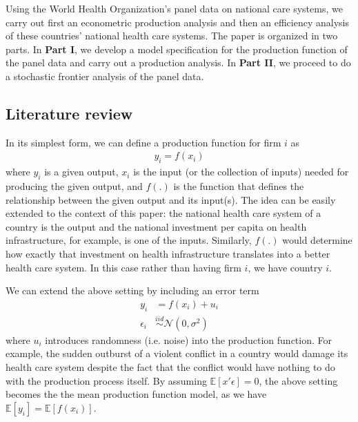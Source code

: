 \documentclass[12pt,a4paper]{article}\usepackage[]{graphicx}\usepackage[]{color}
\begin{document}
Using the World Health Organization's panel data on national care systems, we carry out first an econometric production analysis and then an efficiency analysis of these countries' national health care systems. The paper is organized in two parts. In \textbf{Part I}, we develop a model specification for the production function of the panel data and carry out a production analysis. In \textbf{Part II}, we proceed to do a stochastic frontier analysis of the panel data.

\subsection{Literature review}

In its simplest form, we can define a production function for firm $i$ as
$$
\begin{aligned}
y_i = f(x_i)
\end{aligned}
$$
where $y_i$ is a given output, $x_i$ is the input (or the collection of inputs) needed for producing the given output, and $f(.)$ is the function that defines the relationship between the given output and its input(s). The idea can be easily extended to the context of this paper: the national health care system of a country is the output and the national investment per capita on health infrastructure, for example, is one of the inputs. Similarly, $f(.)$ would determine how exactly that investment on health infrastructure translates into a better health care system. In this case rather than having firm $i$, we have country $i$.

We can extend the above setting by including an error term
$$
\begin{aligned}
y_i & = f(x_i) + u_i \\
\epsilon_i & \overset{iid}{\sim} \mathcal{N}(0, \sigma ^2)
\end{aligned}
$$
where $u_i$ introduces randomness (i.e. noise) into the production function. For example, the sudden outburst of a violent conflict in a country would damage its health care system despite the fact that the conflict would have nothing to do with the production process itself. By assuming $\mathbb{E}[x'\epsilon]=0$, the above setting becomes the the mean production function model, as we have $\mathbb{E}[y_i]=\mathbb{E}[f(x_i)]$.
\end{document}
